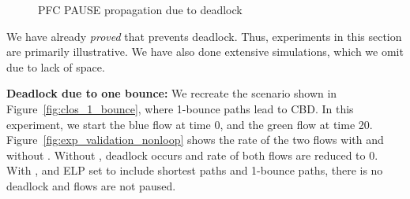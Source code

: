 \begin{figure}[t]
	\centering
	

	
	\caption{PFC PAUSE propagation due to deadlock
	 }\label{fig:exp_validation_propagation}
	
\end{figure}


We have already {\em proved} that \sysname{} prevents deadlock. Thus,
experiments in this section are primarily illustrative. We have also done
extensive simulations, which we omit due to lack of space.

\textbf{Deadlock due to one bounce:} We recreate the scenario shown in
Figure~\ref{fig:clos_1_bounce}, where 1-bounce paths lead to CBD.  In this
experiment, we start the blue flow at time 0, and the green flow at time 20.
Figure~\ref{fig:exp_validation_nonloop} shows the rate of the two flows with and
without \sysname{}.  Without \sysname{}, deadlock occurs and rate of both flows
are reduced to 0. With \sysname{}, and ELP set to include shortest paths and
1-bounce paths, there is no deadlock and flows are not paused.

